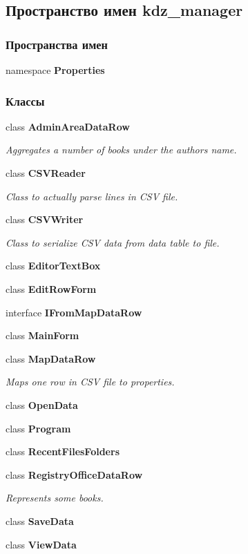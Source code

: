 \subsection{Пространство имен kdz\+\_\+manager}
\label{namespacekdz__manager}
\subsubsection*{Пространства имен}
\begin{DoxyCompactItemize}
\item 
namespace {\bf Properties}
\end{DoxyCompactItemize}
\subsubsection*{Классы}
\begin{DoxyCompactItemize}
\item 
class {\bf Admin\+Area\+Data\+Row}
\begin{DoxyCompactList}\small\item\em Aggregates a number of books under the author\textquotesingle{}s name. \end{DoxyCompactList}\item 
class {\bf C\+S\+V\+Reader}
\begin{DoxyCompactList}\small\item\em Class to actually parse lines in C\+S\+V file. \end{DoxyCompactList}\item 
class {\bf C\+S\+V\+Writer}
\begin{DoxyCompactList}\small\item\em Class to serialize C\+S\+V data from data table to file. \end{DoxyCompactList}\item 
class {\bf Editor\+Text\+Box}
\item 
class {\bf Edit\+Row\+Form}
\item 
interface {\bf I\+From\+Map\+Data\+Row}
\item 
class {\bf Main\+Form}
\item 
class {\bf Map\+Data\+Row}
\begin{DoxyCompactList}\small\item\em Maps one row in C\+S\+V file to properties. \end{DoxyCompactList}\item 
class {\bf Open\+Data}
\item 
class {\bf Program}
\item 
class {\bf Recent\+Files\+Folders}
\item 
class {\bf Registry\+Office\+Data\+Row}
\begin{DoxyCompactList}\small\item\em Represents some books. \end{DoxyCompactList}\item 
class {\bf Save\+Data}
\item 
class {\bf View\+Data}
\end{DoxyCompactItemize}
